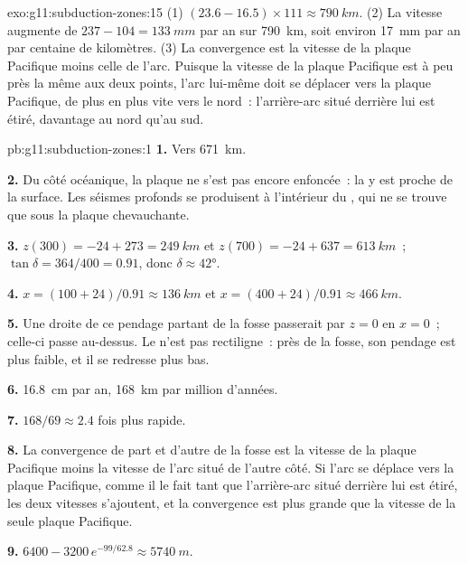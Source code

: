 \begin{solution}{exo:g11:subduction-zones:15}
(1) $(23.6 - 16.5) \times 111 \approx \qty{790}{km}$. (2) La vitesse augmente
de $237 - 104 = \qty{133}{mm}$ par an sur \qty{790}{km}, soit environ
\qty{17}{mm} par an par centaine de kilomètres. (3) La convergence est la
vitesse de la plaque Pacifique moins celle de l'arc. Puisque la vitesse de
la plaque Pacifique est à peu près la même aux deux points, l'arc lui-même
doit se déplacer vers la plaque Pacifique, de plus en plus vite vers le
nord~: l'arrière-arc situé derrière lui est étiré, davantage au nord qu'au
sud.
\end{solution}

\begin{solution}{pb:g11:subduction-zones:1}
\textbf{1.} Vers \qty{671}{km}.

\textbf{2.} Du côté océanique, la plaque ne s'est pas encore enfoncée~: la
 y est proche de la surface. Les séismes profonds se produisent
à l'intérieur du , qui ne se trouve que sous la plaque
chevauchante.

\textbf{3.} $z(300) = -24 + 273 = \qty{249}{km}$ et
$z(700) = -24 + 637 = \qty{613}{km}$~; $\tan\delta = 364/400 = 0.91$, donc
$\delta \approx \ang{42}$.

\textbf{4.} $x = (100 + 24)/0.91 \approx \qty{136}{km}$ et
$x = (400 + 24)/0.91 \approx \qty{466}{km}$.

\textbf{5.} Une droite de ce pendage partant de la fosse passerait par
$z = 0$ en $x = 0$~; celle-ci passe au-dessus. Le  n'est
pas rectiligne~: près de la fosse, son pendage est plus faible, et il se
redresse plus bas.

\textbf{6.} \qty{16.8}{cm} par an, \qty{168}{km} par million d'années.

\textbf{7.} $168/69 \approx 2.4$ fois plus rapide.

\textbf{8.} La convergence de part et d'autre de la fosse est la vitesse de
la plaque Pacifique moins la vitesse de l'arc situé de l'autre côté. Si
l'arc se déplace vers la plaque Pacifique, comme il le fait tant que
l'arrière-arc situé derrière lui est étiré, les deux vitesses s'ajoutent, et
la convergence est plus grande que la vitesse de la seule plaque Pacifique.

\textbf{9.} $6400 - 3200\,e^{-99/62.8} \approx \qty{5740}{m}$.


\end{solution}

